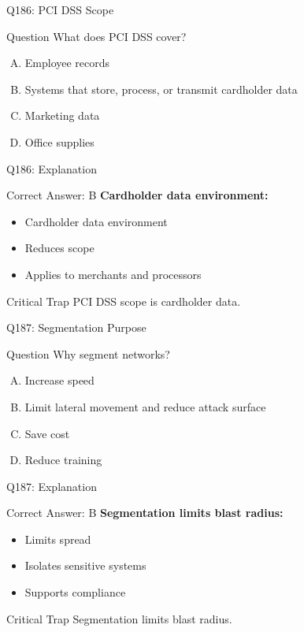 \documentclass{beamer}
\begin{document}
	\begin{frame}{Q186: PCI DSS Scope}
		\begin{block}{Question}
			What does PCI DSS cover?
		\end{block}
		\begin{enumerate}[(A)]
			\item Employee records
			\item Systems that store, process, or transmit cardholder data
			\item Marketing data
			\item Office supplies
		\end{enumerate}
	\end{frame}
	
	\begin{frame}{Q186: Explanation}
		\begin{block}{Correct Answer: B}
			\textbf{Cardholder data environment:}
			\begin{itemize}
				\item Cardholder data environment
				\item Reduces scope
				\item Applies to merchants and processors
			\end{itemize}
		\end{block}
		\begin{alertblock}{Critical Trap}
			PCI DSS scope is cardholder data.
		\end{alertblock}
	\end{frame}
	
	\begin{frame}{Q187: Segmentation Purpose}
		\begin{block}{Question}
			Why segment networks?
		\end{block}
		\begin{enumerate}[(A)]
			\item Increase speed
			\item Limit lateral movement and reduce attack surface
			\item Save cost
			\item Reduce training
		\end{enumerate}
	\end{frame}
	
	\begin{frame}{Q187: Explanation}
		\begin{block}{Correct Answer: B}
			\textbf{Segmentation limits blast radius:}
			\begin{itemize}
				\item Limits spread
				\item Isolates sensitive systems
				\item Supports compliance
			\end{itemize}
		\end{block}
		\begin{alertblock}{Critical Trap}
			Segmentation limits blast radius.
		\end{alertblock}
	\end{frame}
	
\end{document}
